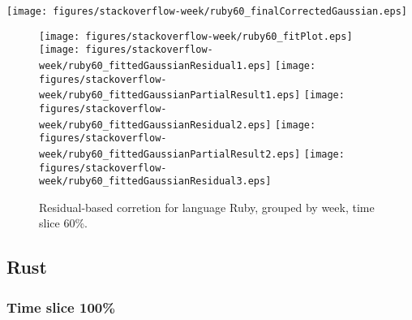\begin{center}
{\texttt{[image: figures/stackoverflow-week/ruby60\_finalCorrectedGaussian.eps]}}
\end{center}

\FloatBarrier

\begin{figure}[t]
\centering
{}
{\texttt{[image: figures/stackoverflow-week/ruby60\_fitPlot.eps]}}
{\texttt{[image: figures/stackoverflow-week/ruby60\_fittedGaussianResidual1.eps]}}
{\texttt{[image: figures/stackoverflow-week/ruby60\_fittedGaussianPartialResult1.eps]}}
{\texttt{[image: figures/stackoverflow-week/ruby60\_fittedGaussianResidual2.eps]}}
{\texttt{[image: figures/stackoverflow-week/ruby60\_fittedGaussianPartialResult2.eps]}}
{\texttt{[image: figures/stackoverflow-week/ruby60\_fittedGaussianResidual3.eps]}}
\caption{Residual-based corretion for language Ruby, grouped by week, time slice 60\%.}
\end{figure}


\FloatBarrier


\subsection{Rust}

\subsubsection{Time slice 100\%}

